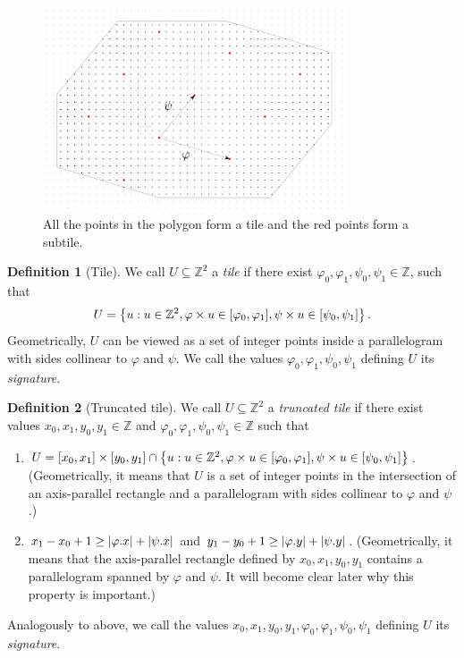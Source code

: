\documentclass[11pt, letterpaper]{article}
\theoremstyle{plain}
\theoremstyle{definition}
\newtheorem{definition}{Definition}
\theoremstyle{remark}
\newcommand{\Z}{\mathbb{Z}}
\renewcommand{\phi}{\varphi}
\newcommand{\set}[1]{\left\lbrace #1 \right\rbrace}
\begin{document}
\begin{figure}[h!]
	\begin{center}
		\includegraphics[width=0.8\textwidth]{drawings/parquet}
	\end{center}
	\caption{All the points in the polygon form a tile and the red points form a subtile.}
	\label{figure:tile}
\end{figure}

\begin{definition}[Tile]\label{tile_definition}
We call $U \subseteq \Z^2$ a \emph{tile} if there exist $\phi_0, \phi_1, \psi_0, \psi_1 \in \Z$, such that
	\[ U = \set{u : u \in \Z^2, \h{u} \in [\phi_0, \phi_1], \s{u} \in [\psi_0, \psi_1]}. \]
Geometrically, $U$ can be viewed as a set of integer points inside a parallelogram with sides collinear to 	$\phi$ and $\psi$. We call the values $\phi_0, \phi_1, \psi_0, \psi_1$ defining $U$ its \emph{signature}. 
\end{definition}

\begin{definition}[Truncated tile]
We call $U \subseteq \Z^2$ a \emph{truncated tile} if there exist values $x_0, x_1, y_0, y_1 \in \Z$ and $\phi_0, \phi_1, \psi_0, \psi_1 \in \Z$ such that 
	\begin{enumerate}
		\item $U = [x_0, x_1] \times [y_0, y_1] \cap \set{u : u \in \Z^2, \h{u} \in [\phi_0, \phi_1], \s{u} \in [\psi_0, \psi_1]}$. (Geometrically, it means that $U$ is a set of integer points in the intersection of an axis-parallel rectangle and a parallelogram with sides collinear to 	$\phi$ and $\psi$.)
		\item $x_1 - x_0 + 1 \ge |\x{\phi}| + |\x{\psi}|$ and $y_1 - y_0 + 1 \ge |\y{\phi}| + |\y{\psi}|$. (Geometrically, it means that the axis-parallel rectangle defined by $x_0, x_1, y_0, y_1$ contains a parallelogram spanned by $\phi$ and $\psi$. It will become clear later why this property is important.)
	\end{enumerate}
Analogously to above, we call the values $x_0, x_1, y_0, y_1, \phi_0, \phi_1, \psi_0, \psi_1$ defining $U$ its \emph{signature}. 
\end{definition}
\end{document}
